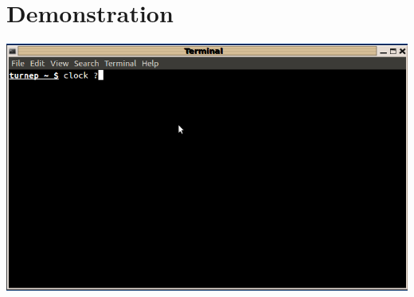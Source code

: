 \documentclass[c]{beamer}
\begin{document}
\section{Demonstration}

\begin{frame}
\includegraphics[scale= 0.4]{demo.png}
\end{frame}
\end{document}
